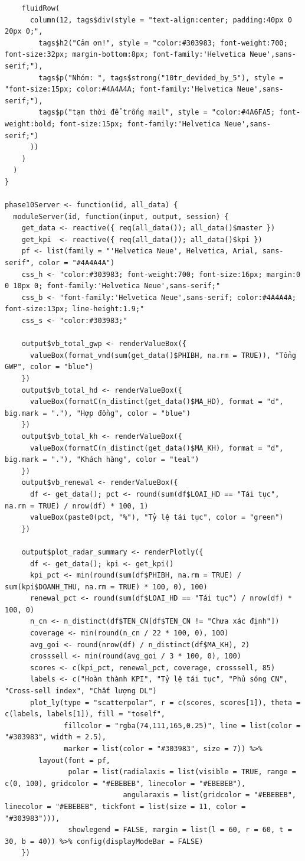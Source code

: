 \documentclass[12pt, a4paper]{article}
\begin{document}
\begin{lstlisting}
    fluidRow(
      column(12, tags$div(style = "text-align:center; padding:40px 0 20px 0;",
        tags$h2("Cảm ơn!", style = "color:#303983; font-weight:700; font-size:32px; margin-bottom:8px; font-family:'Helvetica Neue',sans-serif;"),
        tags$p("Nhóm: ", tags$strong("10tr_devided_by_5"), style = "font-size:15px; color:#4A4A4A; font-family:'Helvetica Neue',sans-serif;"),
        tags$p("tạm thời để trống mail", style = "color:#4A6FA5; font-weight:bold; font-size:15px; font-family:'Helvetica Neue',sans-serif;")
      ))
    )
  )
}

phase10Server <- function(id, all_data) {
  moduleServer(id, function(input, output, session) {
    get_data <- reactive({ req(all_data()); all_data()$master })
    get_kpi  <- reactive({ req(all_data()); all_data()$kpi })
    pf <- list(family = "'Helvetica Neue', Helvetica, Arial, sans-serif", color = "#4A4A4A")
    css_h <- "color:#303983; font-weight:700; font-size:16px; margin:0 0 10px 0; font-family:'Helvetica Neue',sans-serif;"
    css_b <- "font-family:'Helvetica Neue',sans-serif; color:#4A4A4A; font-size:13px; line-height:1.9;"
    css_s <- "color:#303983;"

    output$vb_total_gwp <- renderValueBox({
      valueBox(format_vnd(sum(get_data()$PHIBH, na.rm = TRUE)), "Tổng GWP", color = "blue")
    })
    output$vb_total_hd <- renderValueBox({
      valueBox(formatC(n_distinct(get_data()$MA_HD), format = "d", big.mark = "."), "Hợp đồng", color = "blue")
    })
    output$vb_total_kh <- renderValueBox({
      valueBox(formatC(n_distinct(get_data()$MA_KH), format = "d", big.mark = "."), "Khách hàng", color = "teal")
    })
    output$vb_renewal <- renderValueBox({
      df <- get_data(); pct <- round(sum(df$LOAI_HD == "Tái tục", na.rm = TRUE) / nrow(df) * 100, 1)
      valueBox(paste0(pct, "%"), "Tỷ lệ tái tục", color = "green")
    })

    output$plot_radar_summary <- renderPlotly({
      df <- get_data(); kpi <- get_kpi()
      kpi_pct <- min(round(sum(df$PHIBH, na.rm = TRUE) / sum(kpi$DOANH_THU, na.rm = TRUE) * 100, 0), 100)
      renewal_pct <- round(sum(df$LOAI_HD == "Tái tục") / nrow(df) * 100, 0)
      n_cn <- n_distinct(df$TEN_CN[df$TEN_CN != "Chưa xác định"])
      coverage <- min(round(n_cn / 22 * 100, 0), 100)
      avg_goi <- round(nrow(df) / n_distinct(df$MA_KH), 2)
      crosssell <- min(round(avg_goi / 3 * 100, 0), 100)
      scores <- c(kpi_pct, renewal_pct, coverage, crosssell, 85)
      labels <- c("Hoàn thành KPI", "Tỷ lệ tái tục", "Phủ sóng CN", "Cross-sell index", "Chất lượng DL")
      plot_ly(type = "scatterpolar", r = c(scores, scores[1]), theta = c(labels, labels[1]), fill = "toself",
              fillcolor = "rgba(74,111,165,0.25)", line = list(color = "#303983", width = 2.5),
              marker = list(color = "#303983", size = 7)) %>%
        layout(font = pf,
               polar = list(radialaxis = list(visible = TRUE, range = c(0, 100), gridcolor = "#EBEBEB", linecolor = "#EBEBEB"),
                            angularaxis = list(gridcolor = "#EBEBEB", linecolor = "#EBEBEB", tickfont = list(size = 11, color = "#303983"))),
               showlegend = FALSE, margin = list(l = 60, r = 60, t = 30, b = 40)) %>% config(displayModeBar = FALSE)
    })


\end{lstlisting}
\end{document}

